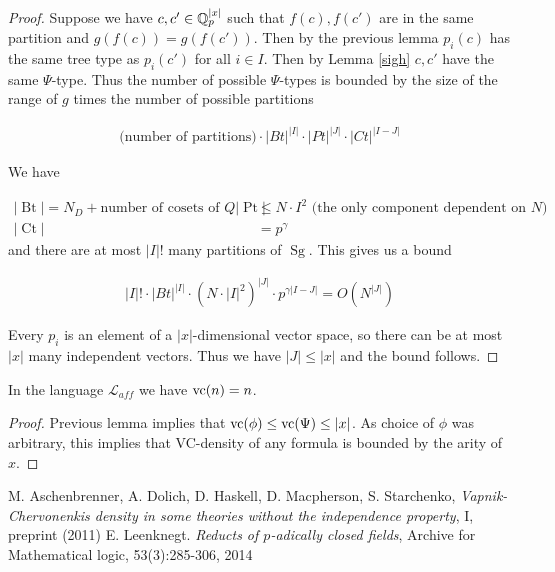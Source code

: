 \documentclass{amsart}
\renewcommand{\LL}{\mathcal L_{aff}}
\DeclareMathOperator{\Sg}{Sg}
\DeclareMathOperator{\Bt}{Bt}
\DeclareMathOperator{\Pt}{Pt}
\DeclareMathOperator{\Ct}{Ct}
\begin{document}
\begin{proof}
	Suppose we have $c, c' \in \mathbb{Q}_p^{|x|}$ such that $f(c), f(c')$ are in the same partition and $g(f(c)) = g(f(c'))$.
	Then by the previous lemma $p_i(c)$ has the same tree type as $p_i(c')$ for all $i\in I$.
	Then by Lemma \ref{sigh} $c, c'$ have the same $\Psi$-type.
	Thus the number of possible $\Psi$-types is bounded by the size of the range of $g$ times the number of possible partitions
	
	\begin{align*}
		\text{(number of partitions)} \cdot |Bt|^{|I|} \cdot |Pt|^{|J|} \cdot |Ct|^{|I-J|}
	\end{align*}
	
	We have
	
	\begin{align*}
		|\Bt| = N_D + \text {number of cosets of $Q$}
		|\Pt| &\leq N \cdot I^2 \text { (the only component dependent on $N$)} \\
		|\Ct| &= p^\gamma 
	\end{align*}
	and there are at most ${|I|}!$ many partitions of $\Sg$. 
	This gives us a bound
	
	\begin{align*}
		{|I|}! \cdot |Bt|^{|I|} \cdot (N \cdot {|I|}^2)^{|J|} \cdot p^{\gamma {|I-J|}} = O(N^{|J|})
	\end{align*}	
	
	Every $p_i$ is an element of a $|x|$-dimensional vector space, so there can be at most $|x|$ many independent vectors.
	Thus we have $|J| \leq |x|$ and the bound follows.
\end{proof}

\begin{Corollary}
	In the language $\LL$ we have $\operatorname{vc}(n) = n$.
\end{Corollary}

\begin{proof}
	Previous lemma implies that $\operatorname{vc}(\phi) \leq \operatorname{vc}(\Psi) \leq |x|$.
	As choice of $\phi$ was arbitrary, this implies that VC-density of any formula is bounded by the arity of $x$.
\end{proof}

\begin{thebibliography}{9}
		M. Aschenbrenner, A. Dolich, D. Haskell, D. Macpherson, S. Starchenko,
		\textit{Vapnik-Chervonenkis density in some theories without the independence property}, I, preprint (2011)
		E. Leenknegt. \textit{Reducts of $p$-adically closed fields}, Archive for Mathematical logic, 53(3):285-306, 2014
\end{thebibliography}
\end{document}

